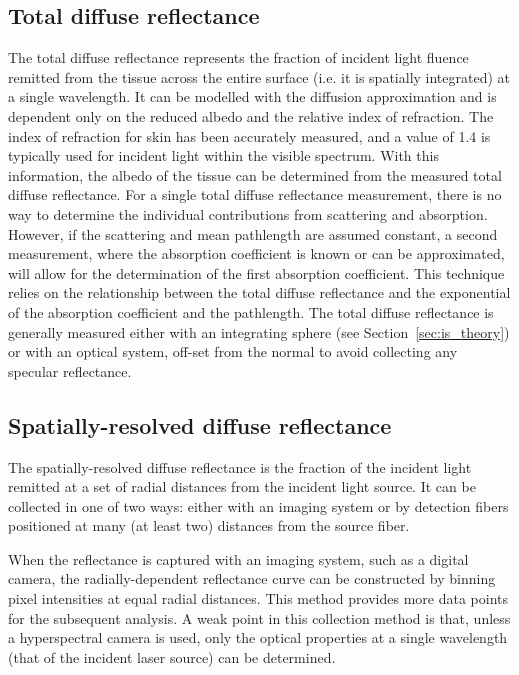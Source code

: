 \subsection{Total diffuse reflectance}
\label{sec:total_diff_refl}
The total diffuse reflectance represents the fraction of incident light fluence remitted from the tissue across the entire surface (i.e. it is spatially integrated) at a single wavelength. It can be modelled with the diffusion approximation and is dependent only on the reduced albedo and the relative index of refraction.\cite{Kim2011} The index of refraction for skin has been accurately measured, and a value of 1.4 is typically used for incident light within the visible spectrum.\cite{Kienle1996a} With this information, the albedo of the tissue can be determined from the measured total diffuse reflectance. For a single total diffuse reflectance measurement, there is no way to determine the individual contributions from scattering and absorption. However, if the scattering and mean pathlength are assumed constant, a second measurement, where the absorption coefficient is known or can be approximated, will allow for the determination of the first absorption coefficient. This technique relies on the relationship between the total diffuse reflectance and the exponential of the absorption coefficient and the pathlength. The total diffuse reflectance is generally measured either with an integrating sphere (see Section~\ref{sec:is_theory}) or with an optical system, off-set from the normal to avoid collecting any specular reflectance.

\subsection{Spatially-resolved diffuse reflectance}
\label{sec:spat_diff_refl}
The spatially-resolved diffuse reflectance is the fraction of the incident light remitted at a set of radial distances from the incident light source. It can be collected in one of two ways: either with an imaging system\cite{Kienle1996b} or by detection fibers positioned at many (at least two) distances from the source fiber.\cite{Kim2011}

When the reflectance is captured with an imaging system, such as a digital camera, the radially-dependent reflectance curve can be constructed by binning pixel intensities at equal radial distances. This method provides more data points for the subsequent analysis. A weak point in this collection method is that, unless a hyperspectral camera is used, only the optical properties at a single wavelength (that of the incident laser source) can be determined.

